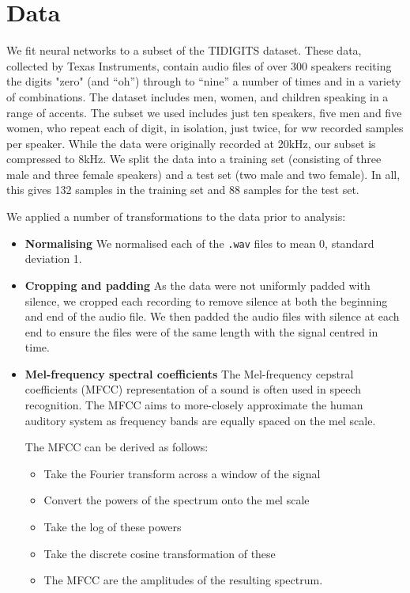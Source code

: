 \section{Data}
We fit neural networks to a subset of the TIDIGITS dataset. These data, collected by Texas Instruments, contain audio files of over 300 speakers reciting the digits "zero" (and ``oh'') through to ``nine'' a number of times and in a variety of combinations. The dataset includes men, women, and children speaking in a range of accents. The subset we used includes just ten speakers, five men and five women, who repeat each of digit, in isolation, just twice, for ww recorded samples per speaker. While the data were originally recorded at 20kHz, our subset is compressed to 8kHz. We split the data into a training set (consisting of three male and three female speakers) and a test set (two male and two female). In all, this gives 132 samples in the training set and 88 samples for the test set.

 

We applied a number of transformations to the data prior to analysis:
\begin{itemize}
\item \textbf{Normalising} We normalised each of the \texttt{.wav} files to mean 0, standard deviation 1.

\item \textbf{Cropping and padding} As the data were not uniformly padded with silence, we cropped each recording to remove silence at both the beginning and end of the audio file. We then padded the audio files with silence at each end to ensure the files were of the same length with the signal centred in time.

\item \textbf{Mel-frequency spectral coefficients}
The Mel-frequency cepstral coefficients (MFCC) representation of a sound is often used in speech recognition. The MFCC aims to more-closely approximate the human auditory system as frequency bands are equally spaced on the mel scale. 

The MFCC can be derived as follows:
\begin{itemize}
\item Take the Fourier transform across a window of the signal
\item Convert the powers of the spectrum onto the mel scale
\item Take the log of these powers
\item Take the discrete cosine transformation of these
\item The MFCC are the amplitudes of the resulting spectrum.
\end{itemize}
\end{itemize}



